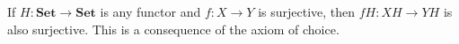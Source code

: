 If $H: \mathbf{Set} \longrightarrow \mathbf{Set}$ is any functor and $f: X \longrightarrow Y$ is surjective, then $fH: XH \longrightarrow YH$ is also surjective. This is a consequence of the axiom of choice.
